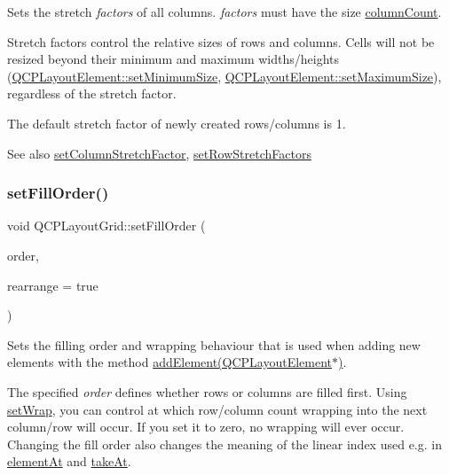 Sets the stretch {\itshape factors} of all columns. {\itshape factors} must have the size \hyperlink{class_q_c_p_layout_grid_a1a2962cbf45011405b64b913afa8e7a2}{column\+Count}.

Stretch factors control the relative sizes of rows and columns. Cells will not be resized beyond their minimum and maximum widths/heights (\hyperlink{class_q_c_p_layout_element_a5dd29a3c8bc88440c97c06b67be7886b}{Q\+C\+P\+Layout\+Element\+::set\+Minimum\+Size}, \hyperlink{class_q_c_p_layout_element_a74eb5280a737ab44833d506db65efd95}{Q\+C\+P\+Layout\+Element\+::set\+Maximum\+Size}), regardless of the stretch factor.

The default stretch factor of newly created rows/columns is 1.

\begin{DoxySeeAlso}{See also}
\hyperlink{class_q_c_p_layout_grid_ae38f31a71687b9d7ee3104852528fb50}{set\+Column\+Stretch\+Factor}, \hyperlink{class_q_c_p_layout_grid_a200b45f9c908f96ebadaa3c8d87a2782}{set\+Row\+Stretch\+Factors} 
\end{DoxySeeAlso}
\mbox{\label{class_q_c_p_layout_grid_affc2f3cfd22f28698c5b29b960d2a391}} 
\subsubsection{\texorpdfstring{set\+Fill\+Order()}{setFillOrder()}}
{\footnotesize\ttfamily void Q\+C\+P\+Layout\+Grid\+::set\+Fill\+Order (\begin{DoxyParamCaption}\item[{\hyperlink{class_q_c_p_layout_grid_a7d49ee08773de6b2fd246edfed353cca}{Fill\+Order}}]{order,  }\item[{bool}]{rearrange = {\ttfamily true} }\end{DoxyParamCaption})}

Sets the filling order and wrapping behaviour that is used when adding new elements with the method \hyperlink{class_q_c_p_layout_grid_a4c44025dd25acd27e053cadfd448ad7b}{add\+Element(\+Q\+C\+P\+Layout\+Element$\ast$)}.

The specified {\itshape order} defines whether rows or columns are filled first. Using \hyperlink{class_q_c_p_layout_grid_ab36af18d77e4428386d02970382ee598}{set\+Wrap}, you can control at which row/column count wrapping into the next column/row will occur. If you set it to zero, no wrapping will ever occur. Changing the fill order also changes the meaning of the linear index used e.\+g. in \hyperlink{class_q_c_p_layout_grid_a4288f174082555f6bd92021bdedb75dc}{element\+At} and \hyperlink{class_q_c_p_layout_grid_a17dd220234d1bbf8835abcc666384d45}{take\+At}.

